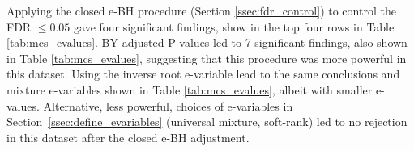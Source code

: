 \documentclass[pdflatex,sn-mathphys-num]{sn-jnl}%
\theoremstyle{thmstyleone}%
\theoremstyle{thmstyletwo}%
\theoremstyle{thmstylethree}%
\begin{document}
Applying the closed e-BH procedure (Section \ref{ssec:fdr_control}) to control the FDR $\leq 0.05$ gave four significant findings, show in the top four rows in Table \ref{tab:mcs_evalues}. \color{blue} BY-adjusted P-values led to 7 significant findings, also shown in Table \ref{tab:mcs_evalues}, suggesting that this procedure was more powerful in this dataset. \color{black}
Using the inverse root e-variable lead to the same conclusions and mixture e-variables shown in Table \ref{tab:mcs_evalues}, albeit with smaller e-values. Alternative, less powerful, choices of e-variables in Section~\ref{ssec:define_evariables} (universal mixture, soft-rank) led to no rejection in this dataset after the closed e-BH adjustment. 
\end{document}
